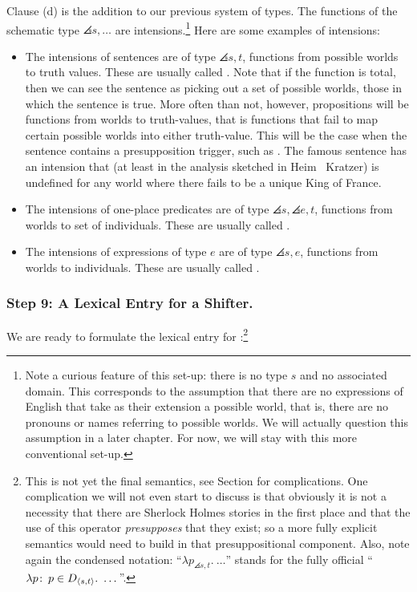 Clause (d) is the addition to our previous system of types. The functions of the
schematic type $\angles{s,\dots}$ are intensions.\footnote{Note a curious
  feature of this set-up: there is no type $s$ and no associated domain. This
  corresponds to the assumption that there are no expressions of English that
  take as their extension a possible world, that is, there are no pronouns or
  names referring to possible worlds. We will actually question this assumption
  in a later chapter. For now, we will stay with this more conventional set-up.}
Here are some examples of intensions:

\begin{itemize}
\item The intensions of sentences are of type $\angles{s,t}$, functions from
  possible worlds to truth values. These are usually called .
  Note that if the function is total, then we can see the sentence as picking
  out a set of possible worlds, those in which the sentence is true. More often
  than not, however, propositions will be  functions from worlds
  to truth-values, that is functions that fail to map certain possible worlds
  into either truth-value. This will be the case when the sentence contains a
  presupposition trigger, such as . The famous sentence
   has an intension that (at least in the
  analysis sketched in Heim \amp\ Kratzer) is undefined for any world where
  there fails to be a unique King of France.
\item The intensions of one-place predicates are of type
  $\angles{s,\angles{e,t}}$, functions from worlds to set of individuals. These
  are usually called .
\item The intensions of expressions of type $e$ are of type $\angles{s,e}$,
  functions from worlds to individuals. These are usually called
  .
\end{itemize}

\subsubsection{Step 9: A Lexical Entry for a Shifter.} \label{sec:lexic-entry-expr}

We are ready to formulate the lexical entry for :\footnote{This is not yet the final semantics, see Section
   for complications. One complication we will not even
  start to discuss is that obviously it is not a necessity that there are
  Sherlock Holmes stories in the first place and that the use of this operator
  \emph{presupposes} that they exist; so a more fully explicit semantics would
  need to build in that presuppositional component. Also, note again the
  condensed notation: ``$\lambda p_{\angles{s,t}}.\ \dots$'' stands for the
  fully official ``$\lambda p\colon\thinspace p \in D_{\langle s,t \rangle}.\ \dots$''.}

